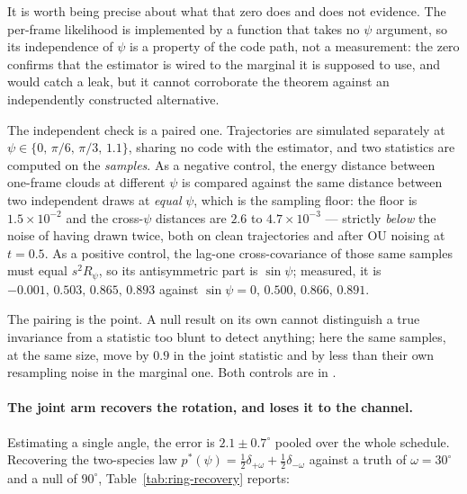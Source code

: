It is worth being precise about what that zero does and does not evidence. The
per-frame likelihood is implemented by a function that takes no $\psi$
argument, so its independence of $\psi$ is a property of the code path, not a
measurement: the zero confirms that the estimator is wired to the marginal it
is supposed to use, and would catch a leak, but it cannot corroborate the
theorem against an independently constructed alternative.

The independent check is a paired one. Trajectories are simulated separately at
$\psi \in \{0,\,\pi/6,\,\pi/3,\,1.1\}$, sharing no code with the estimator, and
two statistics are computed on the \emph{samples}. As a negative control, the
energy distance between one-frame clouds at different $\psi$ is compared
against the same distance between two independent draws at \emph{equal} $\psi$,
which is the sampling floor: the floor is $1.5\times10^{-2}$ and the
cross-$\psi$ distances are $2.6$ to $4.7\times10^{-3}$ --- strictly
\emph{below} the noise of having drawn twice, both on clean trajectories and
after OU noising at $t=0.5$. As a positive control, the lag-one cross-covariance
of those same samples must equal $s^2 R_\psi$, so its antisymmetric part is
$\sin\psi$; measured, it is $-0.001,\,0.503,\,0.865,\,0.893$ against
$\sin\psi = 0,\,0.500,\,0.866,\,0.891$.

The pairing is the point. A null result on its own cannot distinguish a true
invariance from a statistic too blunt to detect anything; here the same
samples, at the same size, move by $0.9$ in the joint statistic and by less
than their own resampling noise in the marginal one. Both controls are in
.

\paragraph{The joint arm recovers the rotation, and loses it to the channel.}
Estimating a single angle, the error is $2.1\pm0.7^\circ$ pooled over the whole
schedule. Recovering the two-species law
$p^*(\psi)=\tfrac12\delta_{+\omega}+\tfrac12\delta_{-\omega}$ against a truth
of $\omega = 30^\circ$ and a null of $90^\circ$, Table~\ref{tab:ring-recovery}
reports:

